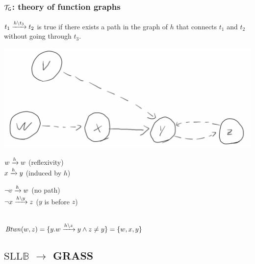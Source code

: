 \documentclass{beamer}
\begin{document}
\begin{frame}
  \frametitle{$\graphtheory$: theory of function graphs}
  
  $\creach{t_1}{t_2}{t_3}$ is true if there exists a path in the graph of $h$ that connects $t_1$ and $t_2$ without going through $t_3$.
  
  \vspace{1ex}

  \begin{center}
  \includegraphics[scale=0.18]{resources/reach_ex.png}
  \end{center}

  \begin{minipage}{.45\linewidth}
  $\reach{w}{w}$ (reflexivity)\\[1ex]
  $\reach{x}{y}$ (induced by $h$)
  \end{minipage}
  \begin{minipage}{.45\linewidth}
  $\neg\reach{v}{w}$ (no path)\\[1ex]
  $\neg\creach{x}{z}{y}$ ($y$ is before $z$)
  \end{minipage}\\[1ex]
  $\Btwn(w,z) = \{y. \creach{w}{y}{z} \land z \neq y\} = \{ w,x,y \}$

\end{frame}

\subsection{$\text{SLL}\mathbb{B}$ $\rightarrow$ GRASS}
\end{document}
